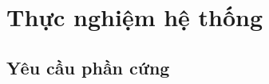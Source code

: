 
\chapter{Thực nghiệm hệ thống} %



\ifpdf
    \graphicspath{{4/figures/PNG/}{4/figures/PDF/}{4/figures/}}
\else
    \graphicspath{{4/figures/EPS/}{4/figures/}}
\fi

\section{Yêu cầu phần cứng}






